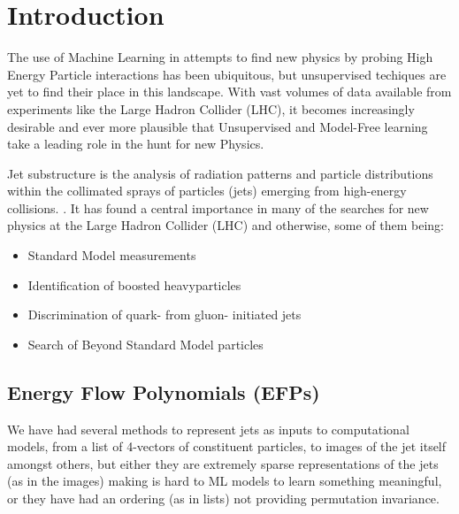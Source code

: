 \section{Introduction}
\label{sec:intro}

The use of Machine Learning in attempts to find new physics by probing High Energy Particle interactions has been ubiquitous, but unsupervised techiques are yet to find their place in this landscape. With vast volumes of data available from experiments like the Large Hadron Collider (LHC), it becomes increasingly desirable and ever more plausible that Unsupervised and Model-Free learning take a leading role in the hunt for new Physics.

Jet substructure is the analysis of radiation patterns and particle distributions within the collimated sprays of particles (jets) emerging from high-energy collisions. \cite{energyflow_poly}.
It has found a central importance in many of the searches for new physics at the Large Hadron Collider (LHC) and otherwise, some of them being:
\begin{itemize}
    \item Standard Model measurements
    \item Identification of boosted heavyparticles
    \item Discrimination of quark- from gluon- initiated jets
    \item Search of Beyond Standard Model particles
\end{itemize}

\subsection{Energy Flow Polynomials (EFPs)}

We have had several methods to represent jets as inputs to computational models, from a list of 4-vectors of constituent particles, to images of the jet itself amongst others, but either they are extremely sparse representations of the jets (as in the images) making is hard to ML models to learn something meaningful, or they have had an ordering (as in lists) not providing permutation invariance.

